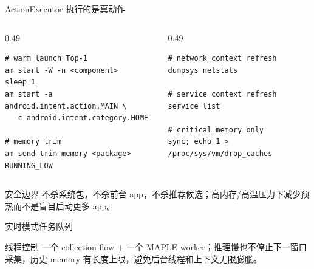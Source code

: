 \documentclass[UTF8,aspectratio=169,10pt]{ctexbeamer}
\begin{document}
\begin{frame}[fragile]{ActionExecutor 执行的是真动作}
  \begin{columns}[T,totalwidth=\textwidth]
    \begin{column}{0.49\textwidth}
\begin{lstlisting}
# warm launch Top-1
am start -W -n <component>
sleep 1
am start -a android.intent.action.MAIN \
  -c android.intent.category.HOME

# memory trim
am send-trim-memory <package> RUNNING_LOW
\end{lstlisting}
    \end{column}
    \begin{column}{0.49\textwidth}
\begin{lstlisting}
# network context refresh
dumpsys netstats

# service context refresh
service list

# critical memory only
sync; echo 1 > /proc/sys/vm/drop_caches
\end{lstlisting}
    \end{column}
  \end{columns}
  \vspace{0.4em}
  \begin{block}{安全边界}
    不杀系统包，不杀前台 app，不杀推荐候选；高内存/高温压力下减少预热而不是盲目启动更多 app。
  \end{block}
\end{frame}

\begin{frame}{实时模式任务队列}
  \centering
  \vspace{0.6em}
  \begin{block}{线程控制}
    一个 collection flow + 一个 MAPLE worker；推理慢也不停止下一窗口采集，历史 memory 有长度上限，避免后台线程和上下文无限膨胀。
  \end{block}
\end{frame}
\end{document}
